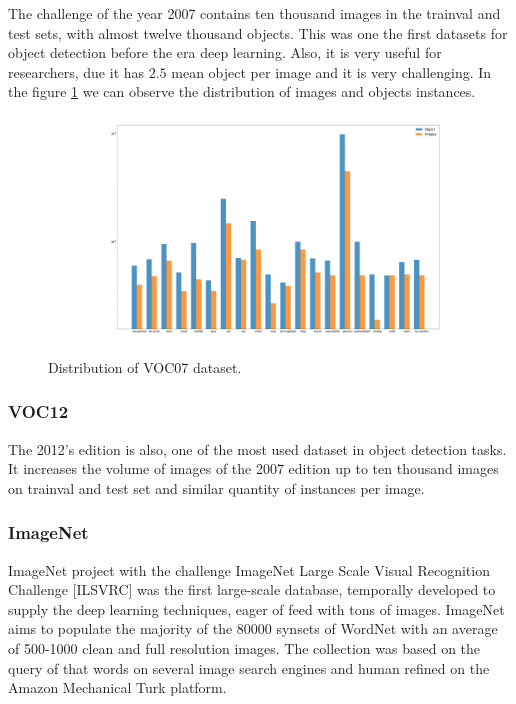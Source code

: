 \documentclass[12pt, a4paper, titlepage,twoside,openright]{article}
\begin{document}

The challenge of the year 2007 contains ten thousand images in the trainval and test sets, with almost twelve thousand objects. This was one the first datasets for object detection before the era deep learning. Also, it is very useful for researchers, due it has $2.5$ mean object per image and it is very challenging. In the figure \ref{data07} we can observe the distribution of images and objects instances. 

\begin{figure}[hptb]
\centering         
\includegraphics[width=0.7\linewidth]{datasets/log1.png}
\caption{Distribution of VOC07 dataset.} \label{data07}
\end{figure}



\subsubsection{VOC12}

The 2012's edition is also, one of the most used dataset in object detection tasks. It increases the volume of images of the 2007 edition up to ten thousand images on trainval and test set and similar quantity of instances per image. 


\subsubsection{ImageNet}



ImageNet project \cite{imagenet} with the challenge ImageNet Large Scale Visual Recognition Challenge [ILSVRC] was the first large-scale database, temporally developed to supply the deep learning techniques, eager of feed with tons of images. ImageNet aims to populate the majority of the 80000 synsets of WordNet with an average of 500-1000 clean and full resolution images. The collection was based on the query of that words on several image search engines and human refined on the Amazon Mechanical Turk platform.
\end{document}
